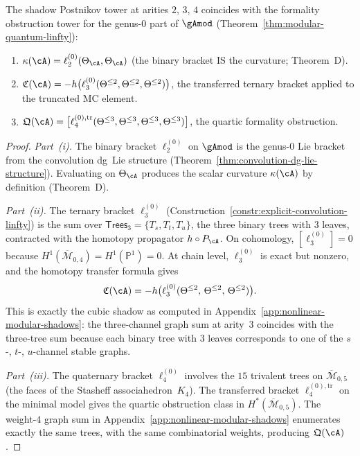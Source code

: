 \begin{proposition}
\label{prop:shadow-formality-low-arity}
\ClaimStatusProvedHere
{}
The shadow Postnikov tower at arities $2$, $3$, $4$
coincides with the formality obstruction tower for the
genus-$0$ part of $\gAmod$
\textup{(}Theorem~\textup{\ref{thm:modular-quantum-linfty})}:
\begin{enumerate}[label=\textup{(\roman*)}]
\item $\kappa(\cA) = \ell_2^{(0)}(\Theta_\cA, \Theta_\cA)$
  \textup{(}the binary bracket IS the curvature;
  Theorem~D\textup{)}.
\item $\mathfrak{C}(\cA)
  = -h\bigl(\ell_3^{(0)}(\Theta^{\leq 2},
  \Theta^{\leq 2}, \Theta^{\leq 2})\bigr)$,
  the transferred ternary bracket applied to
  the truncated MC element.
\item $\mathfrak{Q}(\cA)
  = \bigl[\ell_4^{(0),\mathrm{tr}}(\Theta^{\leq 3},
  \Theta^{\leq 3}, \Theta^{\leq 3}, \Theta^{\leq 3})
  \bigr]$,
  the quartic formality obstruction.
\end{enumerate}
\end{proposition}

\begin{proof}
\emph{Part~(i).}
The binary bracket $\ell_2^{(0)}$ on $\gAmod$ is the
genus-$0$ Lie bracket from the convolution dg~Lie
structure
(Theorem~\ref{thm:convolution-dg-lie-structure}).
Evaluating on $\Theta_\cA$ produces the scalar
curvature $\kappa(\cA)$ by definition (Theorem~D).

\emph{Part~(ii).}
The ternary bracket $\ell_3^{(0)}$
(Construction~\ref{constr:explicit-convolution-linfty})
is the sum over $\mathsf{Trees}_3 = \{T_s, T_t, T_u\}$,
the three binary trees with $3$ leaves, contracted
with the homotopy propagator $h \circ P_\cA$.
On cohomology, $[\ell_3^{(0)}] = 0$ because
$H^1(\overline{\mathcal{M}}_{0,4}) =
H^1(\mathbb{P}^1) = 0$.  At chain level,
$\ell_3^{(0)}$ is exact but nonzero, and the
homotopy transfer formula gives
\[
\mathfrak{C}(\cA)
= -h\bigl(\ell_3^{(0)}(\Theta^{\leq 2},\,
\Theta^{\leq 2},\, \Theta^{\leq 2})\bigr).
\]
This is exactly the cubic shadow as computed in
Appendix~\ref{app:nonlinear-modular-shadows}:
the three-channel graph sum at arity~$3$ coincides
with the three-tree sum because each binary tree
with $3$ leaves corresponds to one of the $s$-, $t$-,
$u$-channel stable graphs.

\emph{Part~(iii).}
The quaternary bracket $\ell_4^{(0)}$ involves the
$15$ trivalent trees on $\overline{\mathcal{M}}_{0,5}$
(the faces of the Stasheff associahedron~$K_4$).  The
transferred bracket $\ell_4^{(0),\mathrm{tr}}$ on the
minimal model gives the quartic obstruction class in
$H^*(\overline{\mathcal{M}}_{0,5})$.  The weight-$4$
graph sum in
Appendix~\ref{app:nonlinear-modular-shadows} enumerates
exactly the same trees, with the same combinatorial
weights, producing $\mathfrak{Q}(\cA)$.
\end{proof}

